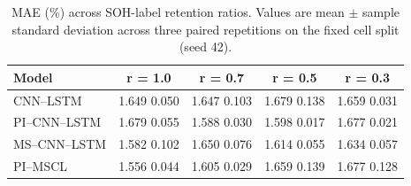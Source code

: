 \begin{table}[htbp]
\caption{MAE (\%) across SOH-label retention ratios. Values are mean $\pm$ sample standard deviation across three paired repetitions on the fixed cell split (seed 42).}
\label{tab:label_budget_mae}
\centering
\setlength{\tabcolsep}{3.5pt}
\begin{tabular*}{\textwidth}{@{\extracolsep{\fill}}lcccc@{}}
\toprule
Model & r = 1.0 & r = 0.7 & r = 0.5 & r = 0.3 \\
\midrule
CNN--LSTM & 1.649 \textpm{} 0.050 & 1.647 \textpm{} 0.103 & 1.679 \textpm{} 0.138 & 1.659 \textpm{} 0.031 \\
PI--CNN--LSTM & 1.679 \textpm{} 0.055 & 1.588 \textpm{} 0.030 & 1.598 \textpm{} 0.017 & 1.677 \textpm{} 0.021 \\
MS--CNN--LSTM & 1.582 \textpm{} 0.102 & 1.650 \textpm{} 0.076 & 1.614 \textpm{} 0.055 & 1.634 \textpm{} 0.057 \\
PI--MSCL & 1.556 \textpm{} 0.044 & 1.605 \textpm{} 0.029 & 1.659 \textpm{} 0.139 & 1.677 \textpm{} 0.128 \\
\bottomrule
\end{tabular*}
\end{table}
